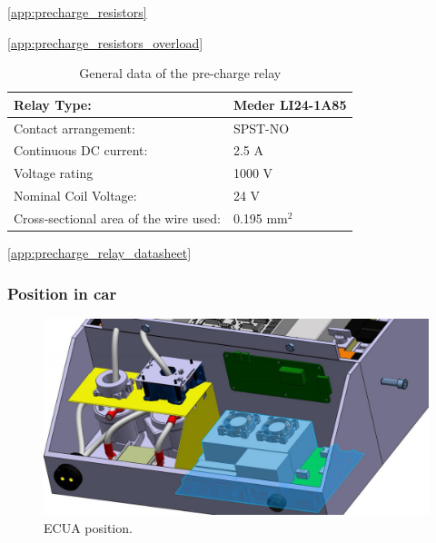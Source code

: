 \ref{app:precharge_resistors}

\ref{app:precharge_resistors_overload}


\begin{table}[H]
	\centering
	\caption{General data of the pre-charge relay}
	\begin{tabu}{|X|X|}
		\hline
		Relay Type: & Meder  LI24-1A85\\
		\hline
		Contact arrangement: &  SPST-NO \\
		\hline
		Continuous DC current:  & 2.5 A\\
		\hline
		Voltage rating  & 1000 V\\
		\hline
		Nominal Coil Voltage: & 24 V \\
		\hline
		Cross-sectional area of the wire used: & 0.195 mm$^2$ \\
		\hline
	\end{tabu}%
	\label{tab:precharge-relay}%
\end{table}%

\ref{app:precharge_relay_datasheet}

\subsubsection{Position in car}

\begin{figure}[H]
	\centering
	\includegraphics[width=\textwidth]{./img/ECUA_POSITION.jpg}
	\caption{ECUA position.}
	\label{fig:ECUA}
\end{figure}